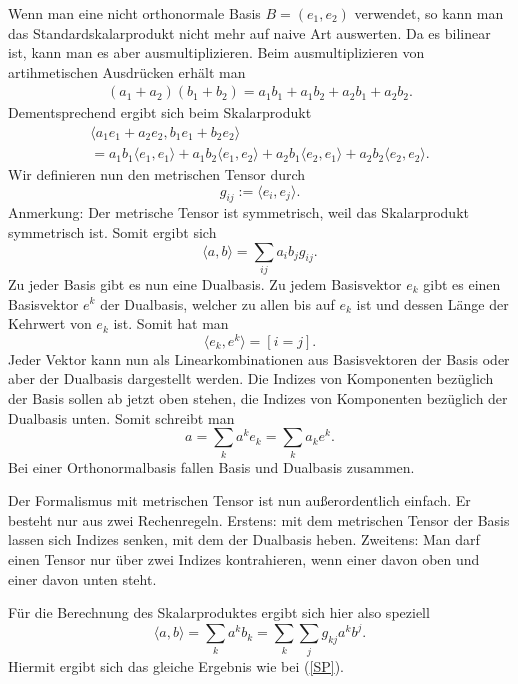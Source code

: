 \documentclass[a4paper,12pt,fleqn,dvipdfmx]{article}
\begin{document}
Wenn man eine nicht orthonormale Basis $B=(e_1,e_2)$ verwendet,
so kann man das Standardskalarprodukt nicht mehr auf naive Art
auswerten. Da es bilinear ist, kann man es aber ausmultiplizieren.
Beim ausmultiplizieren von artihmetischen Ausdrücken erhält man
\begin{gather*}
(a_1+a_2)(b_1+b_2)
= a_1b_1+a_1b_2+a_2b_1+a_2b_2.
\end{gather*}
Dementsprechend ergibt sich beim Skalarprodukt
\begin{gather*}
\langle a_1e_1+a_2e_2, b_1e_1+b_2e_2\rangle\\
= a_1b_1\langle e_1,e_1\rangle
+ a_1b_2\langle e_1,e_2\rangle
+ a_2b_1\langle e_2,e_1\rangle
+ a_2b_2\langle e_2,e_2\rangle.
\end{gather*}
Wir definieren nun den metrischen Tensor durch
\begin{equation}
g_{ij} := \langle e_i,e_j\rangle.
\end{equation}
Anmerkung: Der metrische Tensor ist symmetrisch, weil das
Skalarprodukt symmetrisch ist. Somit ergibt sich
\begin{equation}\label{SP}
\langle a,b\rangle =  \sum_{ij} a_ib_j g_{ij}.
\end{equation}
Zu jeder Basis gibt es nun eine Dualbasis. Zu jedem Basisvektor
$e_k$ gibt es einen Basisvektor $e^k$ der Dualbasis, welcher
zu allen bis auf $e_k$ ist und dessen Länge der Kehrwert
von $e_k$ ist. Somit hat man
\begin{equation}\label{dual}
\langle e_k,e^k\rangle = [i=j].
\end{equation}
Jeder Vektor kann nun als Linearkombinationen aus Basisvektoren
der Basis oder aber der Dualbasis dargestellt werden. Die Indizes
von Komponenten bezüglich der Basis sollen ab jetzt oben stehen,
die Indizes von Komponenten bezüglich der Dualbasis unten. Somit
schreibt man
\begin{equation}
a = \sum_k a^k e_k = \sum_k a_k e^k.
\end{equation}
Bei einer Orthonormalbasis fallen Basis und Dualbasis zusammen.

Der Formalismus mit metrischen Tensor ist nun außerordentlich
einfach. Er besteht nur aus zwei Rechenregeln. Erstens: mit dem
metrischen Tensor der Basis lassen sich Indizes senken, mit dem
der Dualbasis heben. Zweitens: Man darf einen Tensor nur über zwei
Indizes kontrahieren, wenn einer davon oben und einer davon unten
steht.

Für die Berechnung des Skalarproduktes ergibt sich hier also
speziell
\begin{equation}
\langle a,b\rangle = \sum_k a^k b_k
= \sum_k \sum_j g_{kj} a^k b^j.
\end{equation}
Hiermit ergibt sich das gleiche Ergebnis wie bei (\ref{SP}).
\end{document}
